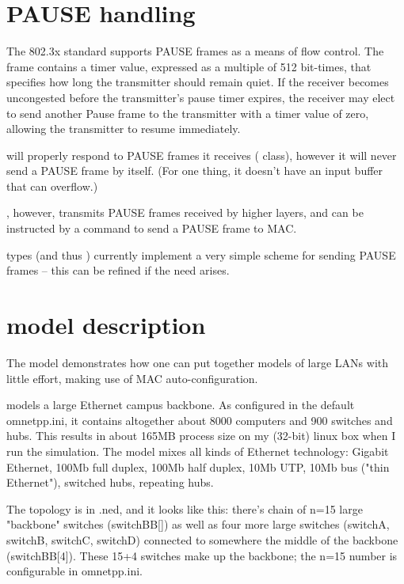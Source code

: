 \section{PAUSE handling}

The 802.3x standard supports PAUSE frames as a means of flow
control. The frame contains a timer value, expressed as a multiple
of 512 bit-times, that specifies how long the transmitter should
remain quiet. If the receiver becomes uncongested before the
transmitter's pause timer expires, the receiver may elect to send
another Pause frame to the transmitter with a timer value of zero,
allowing the transmitter to resume immediately.

 will properly respond to PAUSE frames it receives
( class),
however it will never send a PAUSE frame by itself. (For one thing,
it doesn't have an input buffer that can overflow.)

, however, transmits PAUSE frames received by higher layers,
and  can be instructed by a command to send a PAUSE frame to MAC.

 types (and thus ) currently implement a very simple
scheme for sending PAUSE frames -- this can be refined if the need arises.





\section{ model description}

The  model demonstrates how one can put together models of large
LANs with little effort, making use of MAC auto-configuration.

 models a large Ethernet campus backbone. As configured in the
default omnetpp.ini, it contains altogether about 8000 computers
and 900 switches and hubs. This results in about 165MB process size
on my (32-bit) linux box when I run the simulation.
The model mixes all kinds of Ethernet technology: Gigabit Ethernet,
100Mb full duplex, 100Mb half duplex, 10Mb UTP, 10Mb bus ("thin Ethernet"),
switched hubs, repeating hubs.

The topology is in .ned, and it looks like this: there's chain
of n=15 large "backbone" switches (switchBB[]) as well as four more
large switches (switchA, switchB, switchC, switchD) connected to
somewhere the middle of the backbone (switchBB[4]). These 15+4 switches
make up the backbone; the n=15 number is configurable in omnetpp.ini.

